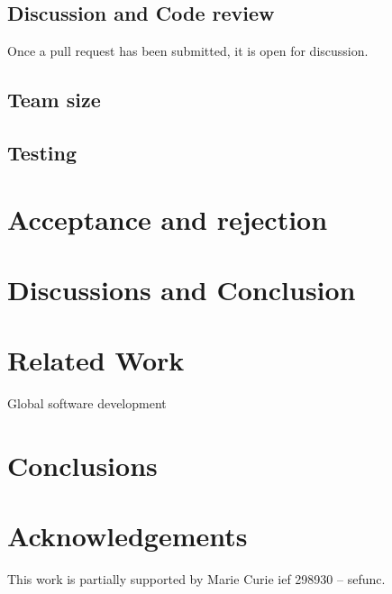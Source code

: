 \documentclass[conference]{IEEEtran}
\begin{document}
\subsection{Discussion and Code review}

Once a pull request has been submitted, it is open for discussion.

\subsection{Team size}

\subsection{Testing}

\section{Acceptance and rejection}



\section{Discussions and Conclusion}

\section{Related Work}

\cite{Bird09}
\cite{Cornf10}
\cite{Dabbi12}
\cite{Bird12}
\cite{Barr12}
\cite{Buffe99}
\cite{Mens02}
\cite{Shiha12}

Global software development
\section{Conclusions}

\section*{Acknowledgements}
This work is partially supported by Marie Curie {\sc ief} 298930 -- {\sc sefunc}.



\end{document}
